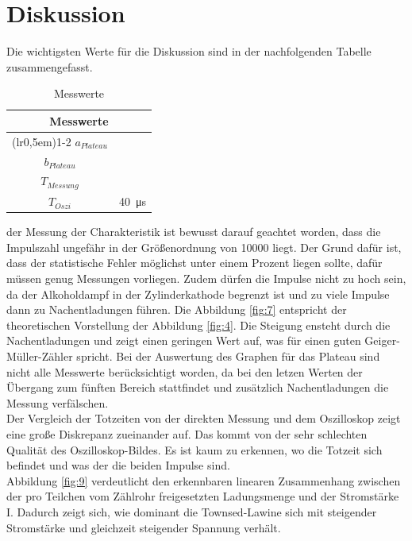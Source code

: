 \section{Diskussion}
Die wichtigsten Werte für die Diskussion sind in der nachfolgenden Tabelle zusammengefasst.
\begin{table}[H]
\centering
\caption{Messwerte}
\begin{tabular}{c c}
    \toprule
    \multicolumn{2}{c}{Messwerte}\\
    \cmidrule(lr{0,5em}){1-2}
    $a_{Plateau}$ &  \\
    $b_{Plateau} $ &  \\
    $T_{Messung}$ & \\
    $T_{Oszi}$ &\SI{40}{\micro\second} \\
    \bottomrule
\end{tabular}
\label{tab:3}
\end{table}

\justifying der Messung der Charakteristik ist bewusst darauf geachtet worden, dass
die Impulszahl ungefähr in der Größenordnung von 10000 liegt. Der Grund dafür ist,
dass der statistische Fehler möglichst unter einem Prozent liegen sollte, dafür müssen genug Messungen
vorliegen. Zudem dürfen die Impulse nicht zu hoch sein, da der Alkoholdampf in der
Zylinderkathode begrenzt ist und zu viele Impulse dann zu Nachentladungen führen.
Die Abbildung \ref{fig:7} entspricht der theoretischen Vorstellung der Abbildung 
\ref{fig:4}. Die Steigung ensteht durch die Nachentladungen und zeigt einen
geringen Wert auf, was für einen guten Geiger-Müller-Zähler spricht.
Bei der Auswertung des Graphen für das Plateau sind nicht alle Messwerte 
berücksichtigt worden, da bei den letzen Werten der Übergang zum
fünften Bereich stattfindet und zusätzlich Nachentladungen die Messung
verfälschen. \\
Der Vergleich der Totzeiten von der direkten Messung und dem Oszilloskop zeigt
eine große Diskrepanz zueinander  auf. Das kommt von der sehr schlechten Qualität
des Oszilloskop-Bildes. Es ist kaum zu erkennen, wo die Totzeit sich befindet
und was der die beiden Impulse sind.\\
\justifying Abbildung \ref{fig:9} verdeutlicht den erkennbaren linearen Zusammenhang
zwischen der pro Teilchen vom Zählrohr freigesetzten Ladungsmenge und 
der Stromstärke I. Dadurch zeigt sich, wie dominant die Townsed-Lawine sich mit
steigender Stromstärke und gleichzeit steigender Spannung verhält.



\newpage
\printbibliography


